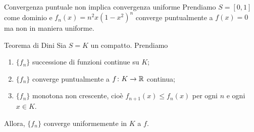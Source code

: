 \documentclass[a4paper]{article}
\begin{document}
\begin{radioactive}
\begin{snippetexample}{Convergenza puntuale non implica convergenza uniforme}
    Prendiamo \(S = [0,1]\) come dominio e \(f_n(x) = n^2 x (1-x^2)^n\)
    converge puntualmente a \(f(x) = 0\) ma non in maniera uniforme.
\end{snippetexample}
\end{radioactive}

\begin{radioactive}
\begin{snippettheorem}{Teorema di Dini}
    Sia \(S=K\) un compatto. Prendiamo
    \begin{enumerate}
        \item \(\{f_n\}\) successione di funzioni continue su \(K\);
        \item \(\{f_n\}\) converge puntualmente a \(f \colon K \to \mathbb{R}\) continua;
        \item \(\{f_n\}\) monotona non crescente, cioè
            \(f_{n+1}(x)\leq f_n(x)\) per ogni \(n\) e ogni \(x\in K\).
    \end{enumerate}
    Allora, \(\{f_n\}\) converge uniformemente in \(K\) a \(f\).
\end{snippettheorem}
\end{radioactive}
\end{document}
